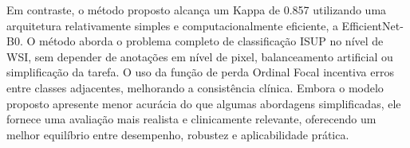 Em contraste, o método proposto alcança um Kappa de 0.857 utilizando uma arquitetura relativamente simples e computacionalmente eficiente, a EfficientNet-B0. O método aborda o problema completo de classificação ISUP no nível de WSI, sem depender de anotações em nível de pixel, balanceamento artificial ou simplificação da tarefa. O uso da função de perda Ordinal Focal incentiva erros entre classes adjacentes, melhorando a consistência clínica. Embora o modelo proposto apresente menor acurácia do que algumas abordagens simplificadas, ele fornece uma avaliação mais realista e clinicamente relevante, oferecendo um melhor equilíbrio entre desempenho, robustez e aplicabilidade prática.

\begin{table}[htb]
	\centering
	\scriptsize
	\setlength{\tabcolsep}{3pt}
	\renewcommand{\arraystretch}{1.0}
	
\end{table}
